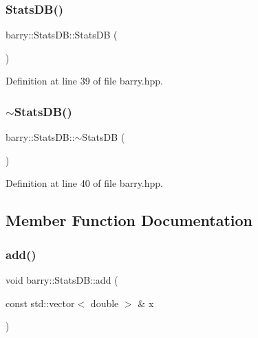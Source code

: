 \subsubsection{\texorpdfstring{Stats\+D\+B()}{StatsDB()}}
{\footnotesize\ttfamily barry\+::\+Stats\+D\+B\+::\+Stats\+DB (\begin{DoxyParamCaption}{ }\end{DoxyParamCaption})\hspace{0.3cm}{\ttfamily [inline]}}



Definition at line 39 of file barry.\+hpp.

\mbox{\label{classbarry_1_1_stats_d_b_a7d511a6eeeae101e18ae47ca616ad204}} 
\subsubsection{\texorpdfstring{$\sim$\+Stats\+D\+B()}{~StatsDB()}}
{\footnotesize\ttfamily barry\+::\+Stats\+D\+B\+::$\sim$\+Stats\+DB (\begin{DoxyParamCaption}{ }\end{DoxyParamCaption})\hspace{0.3cm}{\ttfamily [inline]}}



Definition at line 40 of file barry.\+hpp.



\subsection{Member Function Documentation}
\mbox{\label{classbarry_1_1_stats_d_b_a8f2d22df8ecf8f12bc54157e86d34696}} 
\subsubsection{\texorpdfstring{add()}{add()}}
{\footnotesize\ttfamily void barry\+::\+Stats\+D\+B\+::add (\begin{DoxyParamCaption}\item[{const std\+::vector$<$ double $>$ \&}]{x }\end{DoxyParamCaption})\hspace{0.3cm}{\ttfamily [inline]}}



